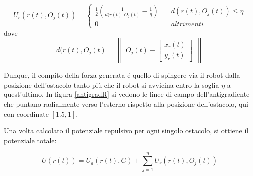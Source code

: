 \documentclass[14pt,a4paper]{extarticle}
\begin{document}
\begin{description}
\begin{equation}
\label{potREq}
U_r(r(t),O_j(t)) = 
\begin{cases}
\frac{1}{2} \left( \frac{1}{d(r(t),O_j(t)} - \frac{1}{\eta} \right) \quad &d(r(t),O_j(t)) \leq \eta \\
0 \quad &altrimenti
\end{cases}
\end{equation}
dove \[ d(r(t),O_j(t) = \begin{Vmatrix}O_j(t) - \begin{bmatrix} x_r(t)\\ y_r(t) \end{bmatrix}\end{Vmatrix}\]

Dunque, il compito della forza generata é quello di spingere via il robot dalla posizione dell'ostacolo tanto più che il robot si avvicina entro la soglia \(\eta\) a quest'ultimo. In figura \ref{antigradR} si vedono le linee di campo dell'antigradiente che puntano radialmente verso l'esterno rispetto alla posizione dell'ostacolo, qui con coordinate \([1.5, 1]\).
\end{description}

Una volta calcolato il potenziale repulsivo per ogni singolo ostacolo, si ottiene il potenziale totale:

\begin{equation}
\label{antigradeq}
U(r(t)) = U_a(r(t),G) + \sum_{j=1}^{n} U_r(r(t),O_j(t))
\end{equation}
\end{document}
